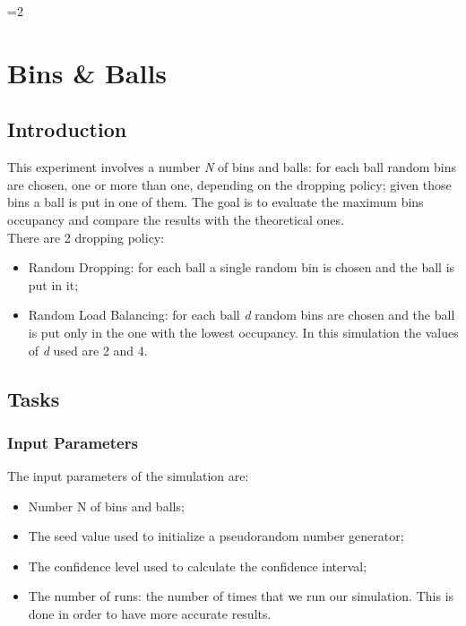 \documentclass[twocolumn,letterpaper]{report}
\newcounter{debug}
\begin{document}
\ifnum\value{debug}=2 {
    
\chapter{Bins \& Balls}
	 
	\section{Introduction}
	 
	This experiment involves a number \emph{N} of bins and balls: for each ball random bins are chosen, one or more than one, depending on the dropping policy; given those bins a ball is put in one of them.	The goal is to evaluate the maximum bins occupancy and compare the results with the theoretical ones. \\
	 There are 2 dropping policy:
	\begin{itemize}
		\item Random Dropping: for each ball a single random bin is chosen and the ball is put in it; 
		\item Random Load Balancing: for each ball \emph{d} random bins are chosen and the ball is put only in the one with the lowest occupancy. In this simulation the values of \emph{d} used are 2 and 4.
	\end{itemize}

	\section{Tasks}
	 
		\subsection{Input Parameters}
			The input parameters of the simulation are:
			\begin{itemize}
				\item Number N of bins and balls;
				\item The seed value used to initialize a pseudorandom number generator;
				\item The confidence level used to calculate the confidence interval;
				\item The number of runs: the number of times that we run our simulation. This is done in order to have more accurate results.
			\end{itemize}
			 
}
\end{document}
